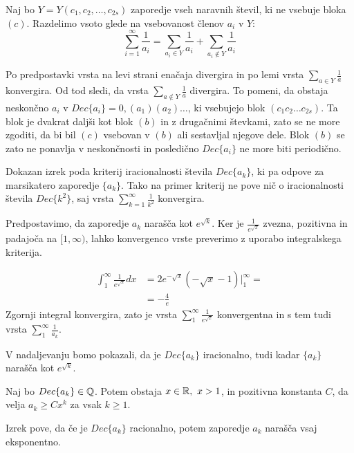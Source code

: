 \documentclass[twoside,11pt]{article}
\begin{document}
Naj bo $Y = Y(c_1, c_2, \dots, c_{2s})$ zaporedje vseh naravnih števil, 
ki ne vsebuje bloka $(c)$.
Razdelimo vsoto glede na vsebovanost členov $a_i$ v $Y$:
\[
    \sum_{i=1}^{\infty} \frac{1}{a_i} = \sum_{a_i \in Y}\frac{1}{a_i} + \sum_{a_i \notin Y} \frac{1}{a_i}
    \]

Po predpostavki vrsta na levi strani enačaja divergira in po lemi vrsta $\sum_{a \in Y}\frac{1}{a}$
konvergira. Od tod sledi, da vrsta $\sum_{a \notin Y} \frac{1}{a}$ divergira.
To pomeni, da obstaja neskončno $a_i$ v $Dec\{a_i\} = 0,(a_1)(a_2) \dots$, ki vsebujejo blok 
$(c_1c_2\dots c_{2s})$. Ta blok je dvakrat daljši kot blok $(b)$ in z drugačnimi števkami, zato se ne more
zgoditi, da bi bil $(c)$ vsebovan v $(b)$ ali sestavljal njegove dele. 
Blok $(b)$ se zato ne ponavlja v neskončnosti in posledično $Dec\{a_i\}$ ne more biti periodično.

\QED


Dokazan izrek poda kriterij iracionalnosti števila $Dec\{a_k\}$,
ki pa odpove za marsikatero zaporedje $\{a_k\}$.
Tako na primer kriterij ne pove nič o iracionalnosti števila $Dec\{k^2\}$, saj vrsta $\sum_{k=1}^{\infty}\frac{1}{k^2}$ konvergira.

Predpostavimo, da zaporedje $a_k$ narašča kot $e^{\sqrt{k}}$.
Ker je $\frac{1}{e^{\sqrt{x}}}$ zvezna, pozitivna in padajoča na $[1, \infty)$,
lahko konvergenco vrste preverimo z uporabo integralskega kriterija.

\[
    \begin{split}
    \int_1^{\infty}\frac{1}{e^{\sqrt{x}}}dx &= 2e^{-\sqrt{x}}(- \sqrt{x} - 1) \big|_1^{\infty} = \\
    &= -\frac{4}{e}
    \end{split}
\]
Zgornji integral konvergira, zato je vrsta $\sum_1^{\infty}\frac{1}{e^{\sqrt{x}}}$ konvergentna
in s tem tudi vrsta $\sum_1^{\infty}\frac{1}{a_k}$.

V nadaljevanju bomo pokazali, da je $Dec\{a_k\}$ iracionalno, tudi kadar $\{a_k\}$ narašča kot $e^{\sqrt{k}}$.

\begin{izrek}
    \label{izrek1clanek2}
    Naj bo $Dec\{a_k\} \in \mathbb{Q}$. Potem obstaja $x \in \mathbb{R}, \ x > 1$, in pozitivna konstanta $C$,
    da velja $a_k \geq Cx^k$ za vsak $k \geq 1$.
\end{izrek}

Izrek pove, da če je $Dec\{a_k\}$ racionalno, potem zaporedje $a_k$ narašča vsaj eksponentno.
\end{document}
